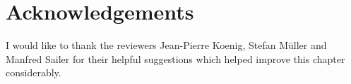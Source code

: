 \documentclass[output=paper
                ,modfonts
                ,nonflat
	        ,collection
	        ,collectionchapter
	        ,collectiontoclongg
 	        ,biblatex
                ,babelshorthands
                ,newtxmath
                ,draftmode
                ,colorlinks, citecolor=brown
]{./langsci/langscibook}
\begin{document}
{%












\section*{Acknowledgements}

I would like to thank the reviewers Jean-Pierre Koenig, Stefan
M\"uller and Manfred Sailer for their helpful suggestions which
helped improve this chapter considerably.


\printbibliography[heading=subbibliography,notkeyword=this]

}
\end{document}
